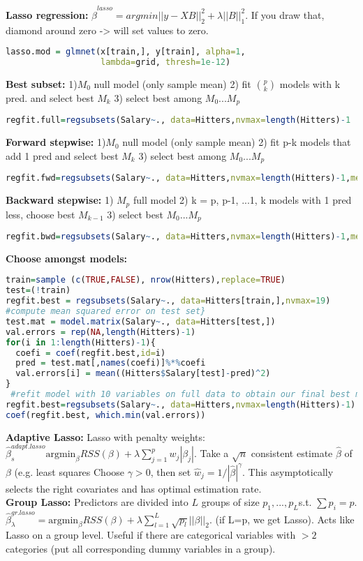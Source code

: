 \textbf{Lasso regression: }
$\hat\beta^{lasso} = argmin ||y-XB||_2^2+ \lambda||B||_1^2$. If you draw that, diamond around zero -> will set values to zero. 
\begin{lstlisting}[language=R]
lasso.mod = glmnet(x[train,], y[train], alpha=1, 
                   lambda=grid, thresh=1e-12)
\end{lstlisting}
\textbf{Best subset: }
1)$M_0$ null model (only sample mean)
2) fit $p \choose k$ models with k pred. and select best $M_k$
3) select best among $M_0 ... M_p$
\begin{lstlisting}[language=R]
regfit.full=regsubsets(Salary~., data=Hitters,nvmax=length(Hitters)-1
\end{lstlisting}

\textbf{Forward stepwise: }
1)$M_0$ null model (only sample mean)
2) fit p-k models that add 1 pred and select best $M_k$
3) select best among $M_0 ... M_p$
\begin{lstlisting}[language=R]
regfit.fwd=regsubsets(Salary~., data=Hitters,nvmax=length(Hitters)-1,method="forward")
\end{lstlisting}
\textbf{Backward stepwise: }
1) $M_p$ full model
2) k = p, p-1, ...1,
k models with 1 pred less, choose best $M_{k-1}$
3) select best $M_0 ... M_p$
\begin{lstlisting}[language=R]
regfit.bwd=regsubsets(Salary~., data=Hitters,nvmax=length(Hitters)-1,method="backward")
\end{lstlisting}
\textbf{Choose amongst models: }
\begin{lstlisting}[language=R]
train=sample (c(TRUE,FALSE), nrow(Hitters),replace=TRUE)
test=(!train)
regfit.best = regsubsets(Salary~., data=Hitters[train,],nvmax=19)
#compute mean squared error on test set}
test.mat = model.matrix(Salary~., data=Hitters[test,])
val.errors = rep(NA,length(Hitters)-1)
for(i in 1:length(Hitters)-1){
  coefi = coef(regfit.best,id=i)
  pred = test.mat[,names(coefi)]%*%coefi
  val.errors[i] = mean((Hitters$Salary[test]-pred)^2)
}
 #refit model with 10 variables on full data to obtain our final best model
regfit.best=regsubsets(Salary~., data=Hitters,nvmax=length(Hitters)-1)
coef(regfit.best, which.min(val.errors))
\end{lstlisting}

\textbf{Adaptive Lasso:} Lasso with penalty weights: $\hat\beta_s^{adapt.lasso}\text{argmin}_\beta RSS(\beta) + \lambda \sum_{j=1}^p w_j |\beta_j|$. Take a $\sqrt{n}$ consistent estimate $\hat\beta$ of $\beta$ (e.g. least squares Choose $\gamma>0$, then set $\hat w_j = {1}/{|\hat\beta|^\gamma}$. This asymptotically selects the right covariates and has optimal estimation rate.\\
\textbf{Group Lasso:} Predictors are divided into $L$ groups of size $p_1, ..., p_L$s.t. $\sum p_i = p$. $\hat\beta_\lambda^{gr.lasso}=\text{argmin}_\beta RSS(\beta)+\lambda \sum_{l=1}^L \sqrt{p_l} ||\beta||_2$. (if L=p, we get Lasso). Acts like Lasso on a group level. Useful if there are categorical variables with $>2$ categories (put all corresponding dummy variables in a group).